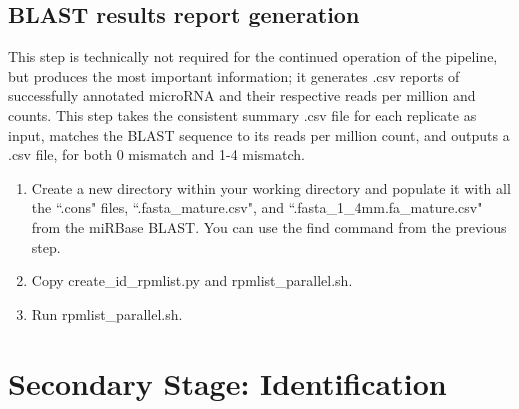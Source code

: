 \documentclass[12pt,titlepage]{article}
\begin{document}
\subsection{BLAST results report generation}
This step is technically not required for the continued operation of the pipeline, but produces the most important information; it generates .csv reports of successfully annotated microRNA and their respective reads per million and counts. This step takes the consistent summary .csv file for each replicate as input, matches the BLAST sequence to its reads per million count, and outputs a .csv file, for both 0 mismatch and 1-4 mismatch.
\begin{enumerate}
\item Create a new directory within your working directory and populate it with all the ``.cons" files, ``.fasta\_mature.csv", and ``.fasta\_1\_4mm.fa\_mature.csv" from the miRBase BLAST. You can use the find command from the previous step.
\item Copy create\_id\_rpmlist.py and rpmlist\_parallel.sh.
\item Run rpmlist\_parallel.sh.
\end{enumerate}

\section{Secondary Stage: Identification}
\end{document}
